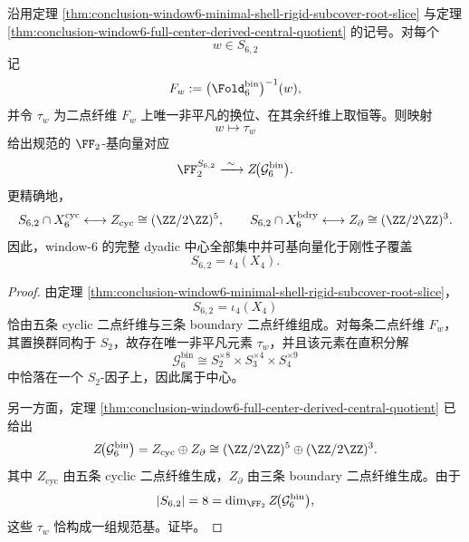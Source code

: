 \begin{theorem}\label{thm:conclusion-window6-minshell-dyadic-center-basis}
沿用定理 \ref{thm:conclusion-window6-minimal-shell-rigid-subcover-root-slice} 与定理 \ref{thm:conclusion-window6-full-center-derived-central-quotient} 的记号。对每个
\[
w\in S_{6,2}
\]
记
\[
F_w:=\bigl(\Fold_6^{\mathrm{bin}}\bigr)^{-1}(w),
\]
并令 \(\tau_w\) 为二点纤维 \(F_w\) 上唯一非平凡的换位、在其余纤维上取恒等。则映射
\[
w\longmapsto \tau_w
\]
给出规范的 \(\FF_2\)-基向量对应
\[
\FF_2^{S_{6,2}}
\xrightarrow{\ \sim\ }
Z\!\bigl(\mathcal G_6^{\mathrm{bin}}\bigr).
\]
更精确地，
\[
S_{6,2}\cap X_6^{\mathrm{cyc}}
\longleftrightarrow
Z_{\mathrm{cyc}}\cong (\ZZ/2\ZZ)^5,
\qquad
S_{6,2}\cap X_6^{\mathrm{bdry}}
\longleftrightarrow
Z_{\partial}\cong (\ZZ/2\ZZ)^3.
\]
因此，window-\(6\) 的完整 dyadic 中心全部集中并可基向量化于刚性子覆盖
\[
S_{6,2}=\iota_4(X_4).
\]
\end{theorem}
\begin{proof}
由定理 \ref{thm:conclusion-window6-minimal-shell-rigid-subcover-root-slice}，
\[
S_{6,2}=\iota_4(X_4)
\]
恰由五条 cyclic 二点纤维与三条 boundary 二点纤维组成。对每条二点纤维 \(F_w\)，其置换群同构于 \(S_2\)，故存在唯一非平凡元素 \(\tau_w\)，并且该元素在直积分解
\[
\mathcal G_6^{\mathrm{bin}}\cong S_2^{\times 8}\times S_3^{\times 4}\times S_4^{\times 9}
\]
中恰落在一个 \(S_2\)-因子上，因此属于中心。

另一方面，定理 \ref{thm:conclusion-window6-full-center-derived-central-quotient} 已给出
\[
Z\!\bigl(\mathcal G_6^{\mathrm{bin}}\bigr)
=
Z_{\mathrm{cyc}}\oplus Z_{\partial}
\cong
(\ZZ/2\ZZ)^5\oplus(\ZZ/2\ZZ)^3.
\]
其中 \(Z_{\mathrm{cyc}}\) 由五条 cyclic 二点纤维生成，\(Z_{\partial}\) 由三条 boundary 二点纤维生成。由于
\[
|S_{6,2}|=8=\dim_{\FF_2}Z\!\bigl(\mathcal G_6^{\mathrm{bin}}\bigr),
\]
这些 \(\tau_w\) 恰构成一组规范基。证毕。
\end{proof}

